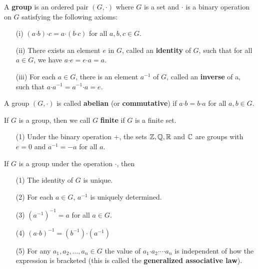\begin{definition}[Groups]
    A \textbf{group} is an ordered pair \( (G, \boldsymbol{\cdot} ) \) where \( G  \) is a set and \( \boldsymbol{\cdot}  \) is a binary operation on \( G  \) satisfying the following axioms:
    \begin{enumerate}
        \item[(i)] \( (a \boldsymbol{\cdot} b ) \boldsymbol{\cdot} c  = a \boldsymbol{\cdot} (b \boldsymbol{\cdot} c ) \) for all \( a,b,c \in G  \). 
        \item[(ii)] There exists an element \( e  \) in \( G  \), called an \textbf{identity} of \( G  \), such that for all \( a \in G  \), we have \( a \boldsymbol{\cdot}  e = e \boldsymbol{\cdot} a = a    \).
        \item[(iii)] For each \( a \in G  \), there is an element \( a^{-1} \) of \( G  \), called an \textbf{inverse} of a, such that \( a \boldsymbol{\cdot} a^{-1} = a^{-1} \boldsymbol{\cdot} a = e  \).
    \end{enumerate}
\end{definition}

\begin{definition}[Abelian]
    A group \( (G, \boldsymbol{\cdot}) \) is called \textbf{abelian} (or \textbf{commutative}) if \( a \boldsymbol{\cdot} b = b \boldsymbol{\cdot} a  \) for all \( a, b \in G  \).
\end{definition}

\begin{definition}
    If \( G  \) is a group, then we call \( G  \) \textbf{finite} if \( G  \) is a finite set.
\end{definition}

\begin{eg}
    \begin{enumerate}
        \item[(1)] Under the binary operation \( +  \), the sets \( \mathbb{Z}, \mathbb{Q}, \mathbb{R}  \) and \( \mathbb{C}  \) are groups with \( e = 0  \) and \( a^{-1} = -a  \) for all \( a  \).
    \end{enumerate}
\end{eg}

\begin{prop}
   If \( G  \) is a group under the operation \( \boldsymbol{\cdot}  \), then 
   \begin{enumerate}
       \item[(1)] The identity of \( G  \) is unique.
       \item[(2)] For each \( a \in G  \), \( a^{-1} \) is uniquely determined.
       \item[(3)] \( (a^{-1})^{-1} = a  \) for all \(  a  \in G  \).
        \item[(4)] \( (a \boldsymbol{\cdot} b)^{-1} = (b^{-1}) \boldsymbol{\cdot} (a^{-1}) \)
        \item[(5)] For any \( {a}_{1}, {a}_{2}, \dots, {a}_{n} \in G   \) the value of \( {a}_{1} \boldsymbol{\cdot} {a}_{2} \boldsymbol{\cdot} \cdots  {a}_{n} \) is independent of how the expression is bracketed (this is called the \textbf{generalized associative law}).
   \end{enumerate}
\end{prop}

